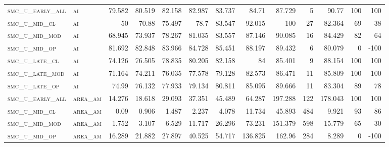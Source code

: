 \begin{landscape}
\begin{center}
\begin{footnotesize}
\begin{longtable}{llrrrrrrrr|rrr}
\hline \hline
\endlastfoot

\textsc{smc\_u\_early\_all} & \textsc{ai        }   & 79.582   & 80.519   & 82.158   & 82.987   & 83.737   & 84.71    & 87.729    & 5      & 90.77         & 100           & 100             \\
\textsc{smc\_u\_mid\_cl   } & \textsc{ai        }   & 50       & 70.88    & 75.497   & 78.7     & 83.547   & 92.015   & 100       & 27     & 82.364        & 69            & 38              \\
\textsc{smc\_u\_mid\_mod  } & \textsc{ai        }   & 68.945   & 73.937   & 78.267   & 81.035   & 83.557   & 87.146   & 90.085    & 16     & 84.429        & 82            & 64              \\
\textsc{smc\_u\_mid\_op   } & \textsc{ai        }   & 81.692   & 82.848   & 83.966   & 84.728   & 85.451   & 88.197   & 89.432    & 6      & 80.079        & 0             & -100            \\
\textsc{smc\_u\_late\_cl  } & \textsc{ai        }   & 74.126   & 76.505   & 78.835   & 80.205   & 82.158   & 84       & 85.401    & 9      & 88.154        & 100           & 100             \\
\textsc{smc\_u\_late\_mod } & \textsc{ai        }   & 71.164   & 74.211   & 76.035   & 77.578   & 79.128   & 82.573   & 86.471    & 11     & 85.809        & 100           & 100             \\
\textsc{smc\_u\_late\_op  } & \textsc{ai        }   & 74.99    & 76.132   & 77.933   & 79.134   & 80.811   & 85.095   & 89.666    & 11     & 83.304        & 89            & 78              \\
\textsc{smc\_u\_early\_all} & \textsc{area\_am  }   & 14.276   & 18.618   & 29.093   & 37.351   & 45.489   & 64.287   & 197.288   & 122    & 178.043       & 100           & 100             \\
\textsc{smc\_u\_mid\_cl   } & \textsc{area\_am  }   & 0.09     & 0.906    & 1.487    & 2.237    & 4.078    & 11.734   & 45.893    & 484    & 9.921         & 93            & 86              \\
\textsc{smc\_u\_mid\_mod  } & \textsc{area\_am  }   & 1.752    & 3.107    & 6.529    & 11.717   & 26.296   & 73.231   & 151.379   & 598    & 15.779        & 65            & 30              \\
\textsc{smc\_u\_mid\_op   } & \textsc{area\_am  }   & 16.289   & 21.882   & 27.897   & 40.525   & 54.717   & 136.825  & 162.96    & 284    & 8.289         & 0             & -100            \\

\end{longtable}
\end{footnotesize}
\end{center}
\end{landscape}

